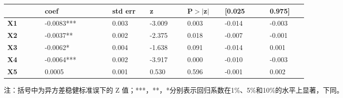 \begin{table}
	\begin{tabular}{p{0.1\linewidth}p{0.18\linewidth}p{0.1\linewidth}p{0.1\linewidth}p{0.1\linewidth}p{0.12\linewidth}p{0.1\linewidth}}
		\toprule
		            & \textbf{coef} & \textbf{std err} & \textbf{z} & \textbf{P$> |$z$|$} & \textbf{[0.025} & \textbf{0.975]} \\
		\midrule
		\textbf{X1} & -0.0083***    & 0.003            & -3.009     & 0.003               & -0.014          & -0.003          \\
		\textbf{X2} & -0.0037**     & 0.002            & -2.375     & 0.018               & -0.007          & -0.001          \\
		\textbf{X3} & -0.0062*      & 0.004            & -1.638     & 0.091               & -0.014          & 0.001           \\
		\textbf{X4} & -0.0064***    & 0.002            & -3.917     & 0.000               & -0.010          & -0.003          \\
		\textbf{X5} & 0.0005        & 0.001            & 0.530      & 0.596               & -0.001          & 0.002           \\
		\bottomrule
	\end{tabular}
    \qquad \small{注：括号中为异方差稳健标准误下的 Z 值；***，**，*分别表示回归系数在1\%、5\%和10\%的水平上显著，下同。}
\end{table}
